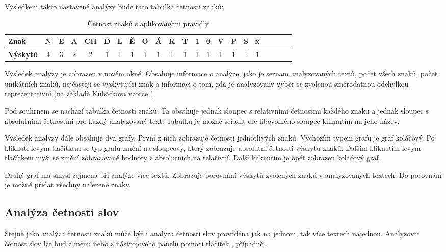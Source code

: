 \documentclass[dp.tex]{subfiles}
\begin{document}
Výsledkem takto nastavené analýzy bude tato tabulka četnosti znaků:

\begin{table}[H]
\caption {Četnost znaků s aplikovanými pravidly} 
\label{tab:title} 
\centering
	\begin{tabular}{|l|c|c|c|c|c|c|c|c|c|c|c|c|c|c|c|c|c|c|c|c|c|}


	\hline \textbf{Znak} & N & E & A & CH & D & L & Ě & O & Á & K & T & 1 & 0 & V & P & S & x \\
	\hline \textbf{Výskytů} & 4 & 3 & 2 & 2 & 1 & 1 & 1 & 1 & 1 & 1 & 1 & 1 & 1 & 1 & 1 & 1 & 1 \\ 
	\hline 
	\end{tabular} 
\end{table} 

Výsledek analýzy je zobrazen v novém okně. Obsahuje informace o analýze, jako je seznam analyzovaných textů, počet všech znaků, počet unikátních znaků, nejčastěji se vyskytující znak a informaci o tom, zda je analyzovaný výběr se zvolenou směrodatnou odchylkou reprezentativní (na základě Kubáčkova vzorce%
). 

Pod souhrnem se nachází tabulka četností znaků. Ta obsahuje jednak sloupec s relativními četnostmi každého znaku a jednak sloupec s absolutními četnostmi pro každý analyzovaný text. Tabulku je možné seřadit dle libovolného sloupce kliknutím na jeho název.

Výsledek analýzy dále obsahuje dva grafy. První z nich zobrazuje četnosti jednotlivých znaků. Výchozím typem grafu je graf koláčový. Po kliknutí levým tlačítkem se typ grafu změní na sloupcový, který zobrazuje absolutní četnosti výskytu znaků. Dalším kliknutím levým tlačítkem myši se změní zobrazované hodnoty z absolutních na relativní. Další kliknutím je opět zobrazen koláčový graf.

Druhý graf má smysl zejména při analýze více textů. Zobrazuje porovnání výskytů zvolených znaků v analyzovaných textech. Do porovnání je možné přidat všechny nalezené znaky.

\subsection{Analýza četnosti slov}

Stejně jako analýza četnosti znaků může být i analýza četnosti slov prováděna jak na jednom, tak více textech najednou. Analyzovat četnost slov lze buď z menu  nebo z nástrojového panelu pomocí tlačítek , případně .
\end{document}
